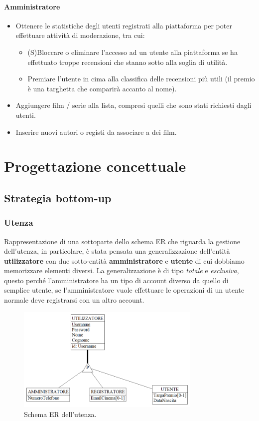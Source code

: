 \documentclass[a4paper,12pt]{report}
\begin{document}
	\subsubsection{Amministratore}
	\begin{itemize}
		\item Ottenere le statistiche degli utenti registrati alla piattaforma per poter effettuare attività di moderazione, tra cui: 
		\begin{itemize}
			\item (S)Bloccare o eliminare l'accesso ad un utente alla piattaforma se ha effettuato troppe recensioni che stanno sotto alla soglia di utilità.
			\item Premiare l'utente in cima alla classifica delle recensioni più utili (il premio è una targhetta che comparirà accanto al nome).
		\end{itemize}
		\item Aggiungere film / serie alla lista, compresi quelli che sono stati richiesti dagli utenti.
		\item Inserire nuovi autori o registi da associare a dei film.
	\end{itemize}
	\chapter{Progettazione concettuale}
	\section{Strategia bottom-up}
	\subsection{Utenza}
	Rappresentazione di una sottoparte dello schema ER che riguarda la gestione dell'utenza, in particolare, è stata pensata una generalizzazione dell'entità \textbf{utilizzatore} con due sotto-entità \textbf{amministratore} e \textbf{utente} di cui dobbiamo memorizzare elementi diversi. La generalizzazione è di tipo \textit{totale} e \textit{esclusiva}, questo perché l'amministratore ha un tipo di account diverso da quello di semplice utente, se l'amministratore vuole effettuare le operazioni di un utente normale deve registrarsi con un altro account.
	\begin{figure}[H]
		\centering
		\includegraphics[width=250pt]{ER/utenza.png}
		\caption{Schema ER dell'utenza.}
	\end{figure}
\end{document}
